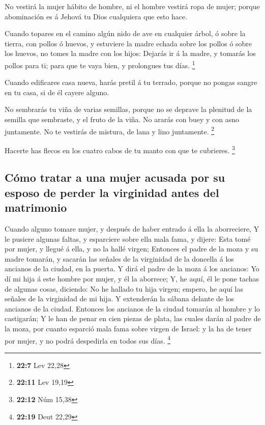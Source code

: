  No vestirá la mujer hábito de hombre, ni el hombre vestirá
ropa de mujer; porque abominación es á Jehová tu Dios cualquiera que
esto hace.

 Cuando topares en el camino algún nido de ave en cualquier
árbol, ó sobre la tierra, con pollos ó huevos, y estuviere la madre
echada sobre los pollos ó sobre los huevos, no tomes la madre con los
hijos:  Dejarás ir á la madre, y tomarás los pollos para ti;
para que te vaya bien, y prolongues tus días. \footnote{\textbf{22:7}
  Lev 22,28}

 Cuando edificares casa nueva, harás pretil á tu terrado,
porque no pongas sangre en tu casa, si de él cayere alguno.

 No sembrarás tu viña de varias semillas, porque no se
deprave la plenitud de la semilla que sembraste, y el fruto de la viña.
 No ararás con buey y con asno juntamente.  No
te vestirás de mistura, de lana y lino juntamente. \footnote{\textbf{22:11}
  Lev 19,19}

 Hacerte has flecos en los cuatro cabos de tu manto con que
te cubrieres. \footnote{\textbf{22:12} Núm 15,38}

\hypertarget{cuxf3mo-tratar-a-una-mujer-acusada-por-su-esposo-de-perder-la-virginidad-antes-del-matrimonio}{%
\subsection{Cómo tratar a una mujer acusada por su esposo de perder la
virginidad antes del
matrimonio}\label{cuxf3mo-tratar-a-una-mujer-acusada-por-su-esposo-de-perder-la-virginidad-antes-del-matrimonio}}

 Cuando alguno tomare mujer, y después de haber entrado á
ella la aborreciere,  Y le pusiere algunas faltas, y
esparciere sobre ella mala fama, y dijere: Esta tomé por mujer, y llegué
á ella, y no la hallé virgen;  Entonces el padre de la moza
y su madre tomarán, y sacarán las señales de la virginidad de la
doncella á los ancianos de la ciudad, en la puerta.  Y dirá
el padre de la moza á los ancianos: Yo dí mi hija á este hombre por
mujer, y él la aborrece;  Y, he aquí, él le pone tachas de
algunas cosas, diciendo: No he hallado tu hija virgen; empero, he aquí
las señales de la virginidad de mi hija. Y extenderán la sábana delante
de los ancianos de la ciudad.  Entonces los ancianos de la
ciudad tomarán al hombre y lo castigarán;  Y le han de
penar en cien piezas de plata, las cuales darán al padre de la moza, por
cuanto esparció mala fama sobre virgen de Israel: y la ha de tener por
mujer, y no podrá despedirla en todos sus días. \footnote{\textbf{22:19}
  Deut 22,29}

